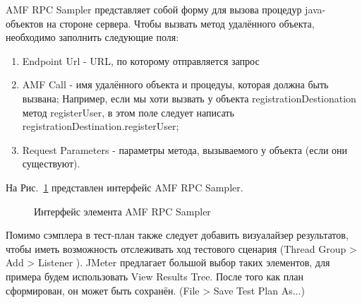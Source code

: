 AMF RPC Sampler представляет собой форму для вызова процедур java-объектов на стороне
сервера. Чтобы вызвать метод удалённого объекта, необходимо заполнить следующие
поля: 

\begin{enumerate}
\item Endpoint Url - URL, по которому отправляется запрос
\item AMF Call - имя удалённого объекта и процедуы, которая должна быть вызвана; 
Например, если мы хоти вызвать у объекта registrationDestionation метод registerUser, 
в этом поле следует написать registrationDestination.registerUser;
\item Request Parameters - параметры метода, вызываемого у объекта (если они 
существуют).
\end{enumerate}

На Рис.~\ref{ris:amfSampler.png} представлен интерфейс AMF RPC Sampler.
\begin{figure}[ht]
\caption{Интерфейс элемента AMF RPC Sampler}
\label{ris:amfSampler.png}
\end{figure}
 
Помимо сэмплера в тест-план также следует добавить визуалайзер результатов, чтобы иметь возможность
отслеживать ход тестового сценария (Thread Group > Add > Listener ).
JMeter предлагает большой выбор таких элементов, для примера будем использовать View Results Tree.
После того как план сформирован, он может быть сохранён. (File > Save Test Plan As...)

